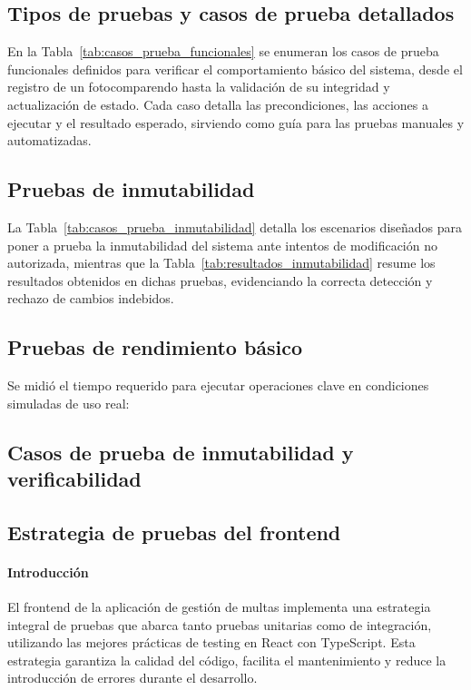 \subsection{Tipos de pruebas y casos de prueba detallados}



\noindent En la Tabla~\ref{tab:casos_prueba_funcionales} se enumeran los casos de prueba funcionales definidos para verificar el comportamiento básico del sistema, desde el registro de un fotocomparendo hasta la validación de su integridad y actualización de estado. Cada caso detalla las precondiciones, las acciones a ejecutar y el resultado esperado, sirviendo como guía para las pruebas manuales y automatizadas.

\subsection{Pruebas de inmutabilidad}



\noindent La Tabla~\ref{tab:casos_prueba_inmutabilidad} detalla los escenarios diseñados para poner a prueba la inmutabilidad del sistema ante intentos de modificación no autorizada, mientras que la Tabla~\ref{tab:resultados_inmutabilidad} resume los resultados obtenidos en dichas pruebas, evidenciando la correcta detección y rechazo de cambios indebidos.

\subsection{Pruebas de rendimiento básico}
Se midió el tiempo requerido para ejecutar operaciones clave en condiciones simuladas de uso real:



\subsection{Casos de prueba de inmutabilidad y verificabilidad}



\subsection{Estrategia de pruebas del frontend}

\paragraph{Introducción}
El frontend de la aplicación de gestión de multas implementa una estrategia integral de pruebas que abarca tanto pruebas unitarias como de integración, utilizando las mejores prácticas de testing en React con TypeScript. Esta estrategia garantiza la calidad del código, facilita el mantenimiento y reduce la introducción de errores durante el desarrollo.

